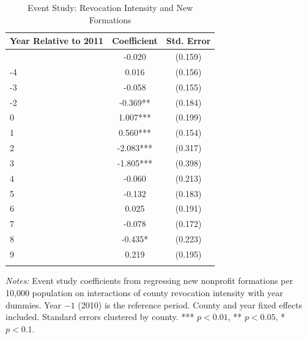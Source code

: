 \begin{table}[t]
\centering
\caption{Event Study: Revocation Intensity and New Formations}
\label{tab:event_study}
\begin{tabular}{lcc}
\hline\hline
Year Relative to 2011 & Coefficient & Std. Error \\
\hline
\addlinespace
-5 & -0.020 & (0.159) \\
-4 & 0.016 & (0.156) \\
-3 & -0.058 & (0.155) \\
-2 & -0.369** & (0.184) \\
0 & 1.007*** & (0.199) \\
1 & 0.560*** & (0.154) \\
2 & -2.083*** & (0.317) \\
3 & -1.805*** & (0.398) \\
4 & -0.060 & (0.213) \\
5 & -0.132 & (0.183) \\
6 & 0.025 & (0.191) \\
7 & -0.078 & (0.172) \\
8 & -0.435* & (0.223) \\
9 & 0.219 & (0.195) \\
\addlinespace
\hline\hline
\end{tabular}
\begin{tablenotes}[flushleft]\small
\item \textit{Notes:} Event study coefficients from regressing new nonprofit formations per 10,000 population on interactions of county revocation intensity with year dummies. Year $-1$ (2010) is the reference period. County and year fixed effects included. Standard errors clustered by county. *** $p<0.01$, ** $p<0.05$, * $p<0.1$.
\end{tablenotes}
\end{table}
